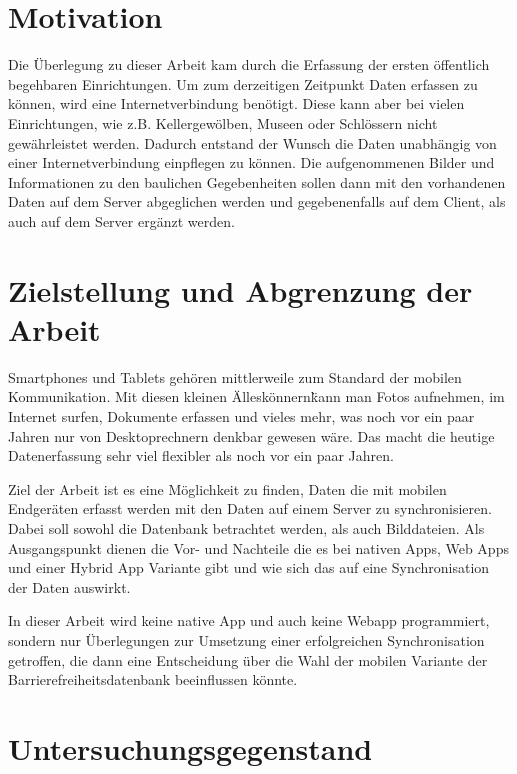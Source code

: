 \section{Motivation}
\label{sec:motivation:mot}

Die Überlegung zu dieser Arbeit kam durch die Erfassung der ersten öffentlich begehbaren Einrichtungen. Um zum derzeitigen Zeitpunkt Daten erfassen zu können, wird eine Internetverbindung benötigt. Diese kann aber bei vielen Einrichtungen, wie z.B. Kellergewölben, Museen oder Schlössern nicht gewährleistet werden. Dadurch entstand der Wunsch die Daten unabhängig von einer Internetverbindung einpflegen zu können. Die aufgenommenen Bilder und Informationen zu den baulichen Gegebenheiten sollen dann mit den vorhandenen Daten auf dem Server abgeglichen werden und gegebenenfalls auf dem Client, als auch auf dem Server ergänzt werden.

\section{Zielstellung und Abgrenzung der Arbeit}
\label{sec:goal:goal}

Smartphones und Tablets gehören mittlerweile zum Standard der mobilen Kommunikation. Mit diesen kleinen \"Alleskönnern\" kann man Fotos aufnehmen, im Internet surfen, Dokumente erfassen und vieles mehr, was noch vor ein paar Jahren nur von Desktoprechnern denkbar gewesen wäre. Das macht die heutige Datenerfassung sehr viel flexibler als noch vor ein paar Jahren.

Ziel der Arbeit ist es eine Möglichkeit zu finden, Daten die mit mobilen Endgeräten erfasst werden mit den Daten auf einem Server zu synchronisieren.  Dabei soll sowohl die Datenbank betrachtet werden, als auch Bilddateien. Als Ausgangspunkt dienen die Vor- und Nachteile die es bei nativen Apps, Web Apps und einer Hybrid App Variante gibt und wie sich das auf eine Synchronisation der Daten auswirkt.

In dieser Arbeit wird keine native App und auch keine Webapp programmiert, sondern nur Überlegungen zur Umsetzung einer erfolgreichen Synchronisation getroffen, die dann eine Entscheidung über die Wahl der mobilen Variante der Barrierefreiheitsdatenbank beeinflussen könnte.

\section{Untersuchungsgegenstand}
\label{sec:investigation:inv}

